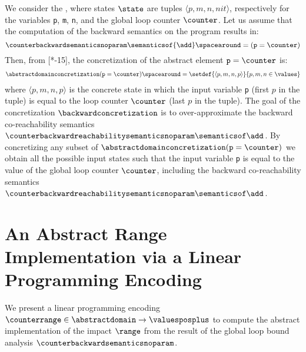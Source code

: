 \begin{example}
  We consider the , where states $\state$ are tuples $\langle p, m, n, nit\rangle$, respectively for the variables \texttt{p}, \texttt{m}, \texttt{n}, and the global loop counter $\counter$.
  Let us assume that the computation of the backward semantics on the program \add{} results in:
  \[
    \counterbackwardsemanticsnoparam\semanticsof{\add} \spacearound=
    (\texttt{p} = \counter)
  \]
  Then, from [*-15], the concretization of the abstract element $\texttt{p} = \counter$ is:
  \begin{align*}
    \abstractdomainconcretization(\texttt{p} = \counter) \spacearound= \setdef{\langle p, m, n, p\rangle}{p, m, n\in\values}
\end{align*}
where $\langle p, m, n, p\rangle$ is the concrete state in which the input variable \texttt{p} (first $p$ in the tuple) is equal to the loop counter $\counter$ (last $p$ in the tuple).
The goal of the concretization $\backwardconcretization$ is to over-approximate the backward co-reachability semantics $\counterbackwardreachabilitysemanticsnoparam\semanticsof\add$.
By concretizing any subset of $\abstractdomainconcretization(\texttt{p} = \counter)$ we obtain all the possible input states such that the input variable \texttt{p} is equal to the value of the global loop counter $\counter$, including the backward co-reachability semantics $\counterbackwardreachabilitysemanticsnoparam\semanticsof\add$.
\end{example}


\section{An Abstract Range Implementation via a Linear Programming Encoding}

We present a linear programming encoding $\counterrange\in\abstractdomain\to\valuesposplus$ to compute the abstract implementation of the impact $\range$ from the result of the global loop bound analysis $\counterbackwardsemanticsnoparam$.


